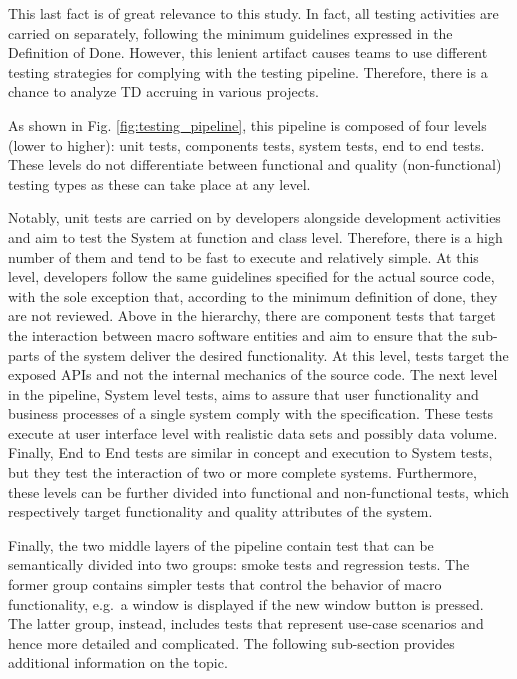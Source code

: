 This last fact is of great relevance to this study. In fact, all testing activities are carried on separately, following the minimum guidelines expressed in the Definition of Done. However, this lenient artifact causes teams to use different testing strategies for complying with the testing pipeline. Therefore, there is a chance to analyze TD accruing in various projects.

As shown in Fig. \ref{fig:testing_pipeline}, this pipeline is composed of four levels (lower to higher): unit tests, components tests, system tests, end to end tests. These levels do not differentiate between functional and quality (non-functional) testing types as these can take place at any level.

Notably, unit tests are carried on by developers alongside development activities and aim to test the System at function and class level. Therefore, there is a high number of them and tend to be fast to execute and relatively simple. At this level, developers follow the same guidelines specified for the actual source code, with the sole exception that, according to the minimum definition of done, they are not reviewed. Above in the hierarchy, there are component tests that target the interaction between macro software entities and aim to ensure that the sub-parts of the system deliver the desired functionality. At this level, tests target the exposed APIs and not the internal mechanics of the source code. The next level in the pipeline, System level tests, aims to assure that user functionality and business processes of a single system comply with the specification. These tests execute at user interface level with realistic data sets and possibly data volume. Finally, End to End tests are similar in concept and execution to System tests, but they test the interaction of two or more complete systems. Furthermore, these levels can be further divided into functional and non-functional tests, which respectively target functionality and quality attributes of the system.

Finally, the two middle layers of the pipeline contain test that can be semantically divided into two groups: smoke tests and regression tests. The former group contains simpler tests that control the behavior of macro functionality, e.g.\ a window is displayed if the new window button is pressed. The latter group, instead, includes tests that represent use-case scenarios and hence more detailed and complicated. The following sub-section provides additional information on the topic.

